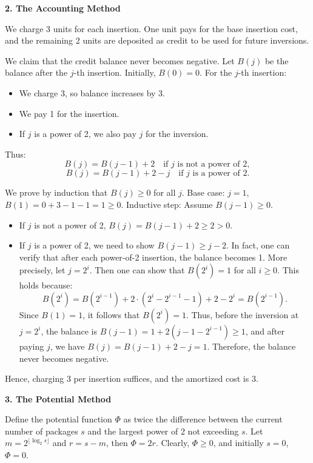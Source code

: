 \noindent \textbf{2. The Accounting Method}

We charge 3 units for each insertion. One unit pays for the base insertion cost, and the remaining 2 units are deposited as credit to be used for future inversions.

We claim that the credit balance never becomes negative. Let \(B(j)\) be the balance after the \(j\)-th insertion. Initially, \(B(0) = 0\). For the \(j\)-th insertion:
\begin{itemize}
    \item We charge 3, so balance increases by 3.
    \item We pay 1 for the insertion.
    \item If \(j\) is a power of 2, we also pay \(j\) for the inversion.
\end{itemize}
Thus:
\[
B(j) = B(j-1) + 2 \quad \text{if } j \text{ is not a power of 2},
\]
\[
B(j) = B(j-1) + 2 - j \quad \text{if } j \text{ is a power of 2}.
\]

We prove by induction that \(B(j) \geq 0\) for all \(j\). 
Base case: \(j=1\), \(B(1)=0+3-1-1=1 \geq 0\).
Inductive step: Assume \(B(j-1) \geq 0\).
\begin{itemize}
    \item If \(j\) is not a power of 2, \(B(j) = B(j-1)+2 \geq 2 > 0\).
    \item If \(j\) is a power of 2, we need to show \(B(j-1) \geq j-2\). In fact, one can verify that after each power-of-2 insertion, the balance becomes 1. More precisely, let \(j = 2^i\). Then one can show that \(B(2^i) = 1\) for all \(i \geq 0\). This holds because:
        \[
        B(2^i) = B(2^{i-1}) + 2 \cdot (2^i - 2^{i-1} - 1) + 2 - 2^i = B(2^{i-1}).
        \]
        Since \(B(1)=1\), it follows that \(B(2^i)=1\). Thus, before the inversion at \(j=2^i\), the balance is \(B(j-1) = 1 + 2(j-1 - 2^{i-1}) \geq 1\), and after paying \(j\), we have \(B(j) = B(j-1) + 2 - j = 1\). Therefore, the balance never becomes negative.
\end{itemize}
Hence, charging 3 per insertion suffices, and the amortized cost is 3.

\noindent  \textbf{3. The Potential Method}

Define the potential function \(\Phi\) as twice the difference between the current number of packages \(s\) and the largest power of 2 not exceeding \(s\). Let \(m = 2^{\lfloor \log_2 s \rfloor}\) and \(r = s - m\), then \(\Phi = 2r\). Clearly, \(\Phi \geq 0\), and initially \(s=0\), \(\Phi=0\).

